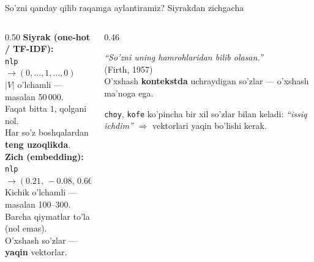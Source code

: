 \documentclass[aspectratio=169,11pt]{beamer}
\begin{document}
\begin{frame}{So'zni qanday qilib raqamga aylantiramiz? Siyrakdan zichgacha}
  \begin{columns}[T]
    \begin{column}{0.50\textwidth}
      \textbf{Siyrak (one-hot / TF-IDF):}\\[4pt]
      \small
      \texttt{nlp} $\to (0,\ldots,1,\ldots,0)$\\[2pt]
      \footnotesize
      $|V|$ o'lchamli --- masalan 50\,000.\\
      Faqat bitta $1$, qolgani nol.\\
      Har so'z boshqalardan \textbf{teng uzoqlikda}.\\[6pt]
      \normalsize\textbf{Zich (embedding):}\\[4pt]
      \small
      \texttt{nlp} $\to (0.21,\,-0.08,\,0.66,\ldots)$\\[2pt]
      \footnotesize
      Kichik o'lchamli --- masalan 100--300.\\
      Barcha qiymatlar to'la (nol emas).\\
      O'xshash so'zlar --- \textbf{yaqin} vektorlar.
    \end{column}
    \begin{column}{0.46\textwidth}
      \begin{tcolorbox}[defbox,title=Distributiv gipoteza,top=2pt,bottom=2pt]
        \footnotesize
        \textit{``So'zni uning hamrohlaridan bilib olasan.''}\\
        (Firth, 1957)\\[4pt]
        O'xshash \textbf{kontekstda} uchraydigan so'zlar ---
        o'xshash ma'noga ega.
      \end{tcolorbox}
      \vspace{4pt}
      \footnotesize
      \texttt{choy}, \texttt{kofe} ko'pincha bir xil so'zlar bilan
      keladi: \textit{``issiq \underline{\hspace{0.7cm}} ichdim''} $\Rightarrow$ vektorlari
      yaqin bo'lishi kerak.
    \end{column}
  \end{columns}
\end{frame}
\end{document}
